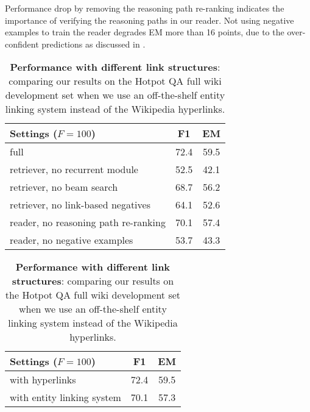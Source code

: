 Performance drop by removing the reasoning path re-ranking indicates the importance of verifying the reasoning paths in our reader.
Not using negative examples to train the reader degrades EM more than 16 points, due to the over-confident predictions as discussed in \cite{clark-gardner-2018-simple}.

\begin{table}[!tb]
\begin{minipage}{.50\linewidth}
\vspace{-0.3cm}
    \centering
    \small{
\begin{tabular}{ l | c | c }\toprule 
  Settings ($F=100$) & F1 & EM \\
  \midrule
full & 72.4 & 59.5 \\\hdashline
retriever, no recurrent module & 52.5 & 42.1 \\
retriever, no beam search &  68.7 & 56.2 \\
retriever, no link-based negatives  & 64.1  &  52.6 \\ 
\hline
reader, no reasoning path re-ranking  & 70.1 & 57.4 \\
reader, no negative examples  & 53.7 & 43.3  \\
\bottomrule
\end{tabular}
\caption{{\bf Ablation study}: evaluating different variants of our model on HotpotQA full wiki.
}\label{tab:ablation_study}
    }
\end{minipage}
\hspace{2mm}
\begin{minipage}{.45\linewidth}
\vspace{-0.6cm}
    \centering
    \small{
\begin{tabular}{ l | c | c }\toprule 
  Settings ($F=100$) & F1 & EM \\
  \midrule
with hyperlinks & 72.4 & 59.5 \\\hdashline
with entity linking system & 70.1 & 57.3  \\
\bottomrule
\end{tabular}
\caption{{\bf Performance with different link structures}: comparing our results on the Hotpot QA full wiki development set when we use an off-the-shelf entity linking system instead of the Wikipedia hyperlinks.
}\label{tab:entity_link}
    }
\end{minipage}
\end{table}


